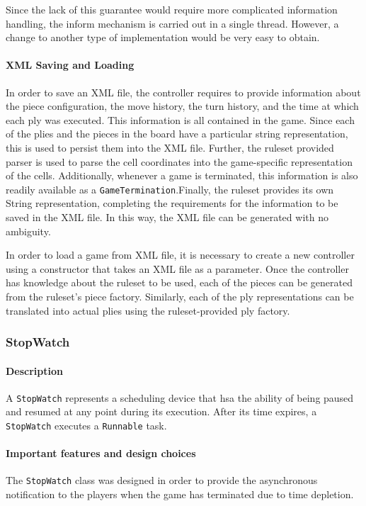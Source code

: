 												Since the lack of this guarantee would require more complicated information handling, the inform
												mechanism is carried out in a single thread. However, a change to another type of implementation 
												would be very easy to obtain. 
												 
				\paragraph{XML Saving and Loading} 
					In order to save an XML file, the controller requires to provide information about the piece configuration, 
					the move history, the turn history, and the time at which each ply was executed. This information is all contained
					in the game. Since each of the plies and the pieces in the board have a particular string representation, this
					is used to persist them into the XML file. Further, the ruleset provided parser is used to parse the cell coordinates
					into the game-specific representation of the cells. Additionally, whenever a game is terminated, this information 
					is also readily available as a \texttt{GameTermination}.Finally, the ruleset provides its own 
					String representation, completing the requirements for the information to be saved in the XML file. In this way, the 
					XML file can be generated with no ambiguity. 
					
					In order to load a game from XML file, it is necessary to create a new controller using a constructor that takes an 
					XML file as a parameter. Once the controller has knowledge about the ruleset to be used, each of the pieces
					can be generated from the ruleset's piece factory. Similarly, each of the ply 
					representations can be translated into actual plies using the ruleset-provided ply factory. 
		

			\subsubsection{StopWatch} 
				\paragraph{Description} A \texttt{StopWatch} represents a scheduling device that hsa
																the ability of being paused and resumed at any point during
																its execution. After its time expires, a \texttt{StopWatch}
																executes a \texttt{Runnable} task. 
				\paragraph{Important features and design choices} 
																The \texttt{StopWatch} class was designed in order to provide 
																the asynchronous notification to the players when the game has terminated
																due to time depletion. 
																
